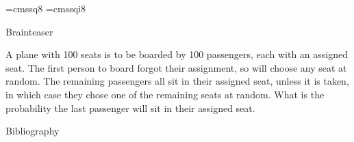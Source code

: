 \documentclass[aspectratio=169]{beamer}
\begin{document}
\font\eightss=cmssq8
\font\eightssi=cmssqi8
\newcommand\quoteAuthorDate[3]{\begingroup
  \baselineskip 10pt
  \parfillskip 0pt
  \interlinepenalty 10000 %
  \leftskip 0pt plus 40pc minus \parindent
  \let\rm=\eightss
  \let\sl=\eightssi
  \everypar{\sl}#1\par
  \nobreak\smallskip
  \noindent\rm--- #2\unskip\enspace(#3)\par
  \endgroup}
\begin{frame}{Brainteaser}
    \begin{center}
        \item A plane with 100 seats is to be boarded by 100 passengers, each with an assigned seat. The first person to board forgot their assignment, so will choose any seat at random. The remaining passengers all sit in their assigned seat, unless it is taken, in which case they chose one of the remaining seats at random. What is the probability the last passenger will sit in their assigned seat. 
    \end{center}
\end{frame}

\begin{frame}[allowframebreaks]{Bibliography}
    \tiny
    
    
    
\end{frame}
\end{document}
